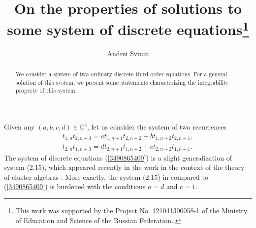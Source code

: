 \documentclass[12pt]{llncs}
\begin{document}
\fi

\title{On the properties of solutions to some system of discrete equations\thanks{This work was supported by the Project No. 121041300058-1 of the Ministry of Education and Science of the Russian Federation..}}

\author{Andrei Svinin}

\maketitle

\begin{abstract}
We consider a system of two ordinary discrete third-order equations. For a general solution of this system, we present some statements characterizing the integrability property of this system.

\end{abstract}




Given any $(a, b, c, d)\in \mathbb{C}^4$, let us consider the system of two recurrences
\begin{equation}
\begin{array}{l}
t_{1, n} t_{2, n+3}=a t_{1, n+1} t_{2, n+2} + b t_{1, n+2} t_{2, n+1}, \\[0.3cm]
t_{2, n} t_{1, n+3}=d t_{2, n+1} t_{1, n+2} + c t_{2, n+2} t_{1, n+1}. 
\end{array}
\label{3490865409}
\end{equation}
The system of discrete equations (\ref{3490865409}) is a slight generalization of system (2.15), which appeared recently in the work \cite{Hone2023} in the context of the theory of cluster algebras \cite{Fomin2002}. More exactly, the system (2.15) in \cite{Hone2023} compared to (\ref{3490865409}) is burdened with the conditions $a=d$ and $c=1$.
\end{document}
